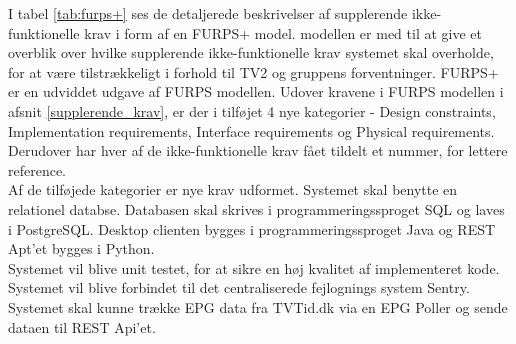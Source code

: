\noindent I tabel \ref{tab:furps+} ses de detaljerede beskrivelser af supplerende ikke-funktionelle krav i form af en FURPS+ model. modellen er med til at give et overblik over hvilke supplerende ikke-funktionelle krav systemet skal overholde, for at være tilstrækkeligt i forhold til TV2 og gruppens forventninger.
FURPS+ er en udviddet udgave af FURPS modellen. Udover kravene i FURPS modellen i afsnit \ref{supplerende_krav}, er der i tilføjet 4 nye kategorier - Design constraints, Implementation requirements, Interface requirements og Physical requirements. Derudover har hver af de ikke-funktionelle krav fået tildelt et nummer, for lettere reference. \\
Af de tilføjede kategorier er nye krav udformet. Systemet skal benytte en relationel databse. Databasen skal skrives i programmeringssproget SQL og laves i PostgreSQL. Desktop clienten bygges i programmeringssproget Java og REST Apt'et bygges i Python.\\
Systemet vil blive unit testet, for at sikre en høj kvalitet af implementeret kode. Systemet vil blive forbindet til det centraliserede fejlognings system Sentry.\\
Systemet skal kunne trække EPG data fra TVTid.dk via en EPG Poller og sende dataen til REST Api'et.

